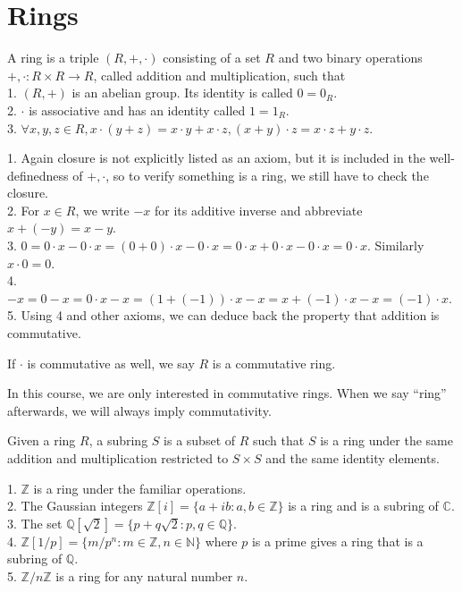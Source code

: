 \section{Rings}
\begin{definition}
    A ring is a triple $(R,+,\cdot)$ consisting of a set $R$ and two binary operations $+,\cdot:R\times R\to R$, called addition and multiplication, such that\\
    1. $(R,+)$ is an abelian group.
    Its identity is called $0=0_R$.\\
    2. $\cdot$ is associative and has an identity called $1=1_R$.\\
    3. $\forall x,y,z\in R,x\cdot(y+z)=x\cdot y+x\cdot z,(x+y)\cdot z=x\cdot z+y\cdot z$.
\end{definition}
\begin{remark}
    1. Again closure is not explicitly listed as an axiom, but it is included in the well-definedness of $+,\cdot$, so to verify something is a ring, we still have to check the closure.\\
    2. For $x\in R$, we write $-x$ for its additive inverse and abbreviate $x+(-y)=x-y$.\\
    3. $0=0\cdot x-0\cdot x=(0+0)\cdot x-0\cdot x=0\cdot x+0\cdot x-0\cdot x=0\cdot x$.
    Similarly $x\cdot 0=0$.\\
    4. $-x=0-x=0\cdot x-x=(1+(-1))\cdot x-x=x+(-1)\cdot x-x=(-1)\cdot x$.\\
    5. Using 4 and other axioms, we can deduce back the property that addition is commutative.
\end{remark}
\begin{definition}
    If $\cdot$ is commutative as well, we say $R$ is a commutative ring.
\end{definition}
In this course, we are only interested in commutative rings.
When we say ``ring'' afterwards, we will always imply commutativity.
\begin{definition}
    Given a ring $R$, a subring $S$ is a subset of $R$ such that $S$ is a ring under the same addition and multiplication restricted to $S\times S$ and the same identity elements.
\end{definition}
\begin{example}
    1. $\mathbb Z$ is a ring under the familiar operations.\\
    2. The Gaussian integers $\mathbb Z[i]=\{a+ib:a,b\in\mathbb Z\}$ is a ring and is a subring of $\mathbb C$.\\
    3. The set $\mathbb Q[\sqrt{2}]=\{p+q\sqrt 2:p,q\in\mathbb Q\}$.\\
    4. $\mathbb Z[1/p]=\{m/p^n:m\in\mathbb Z,n\in\mathbb N\}$ where $p$ is a prime gives a ring that is a subring of $\mathbb Q$.\\
    5. $\mathbb Z/n\mathbb Z$ is a ring for any natural number $n$.
\end{example}

